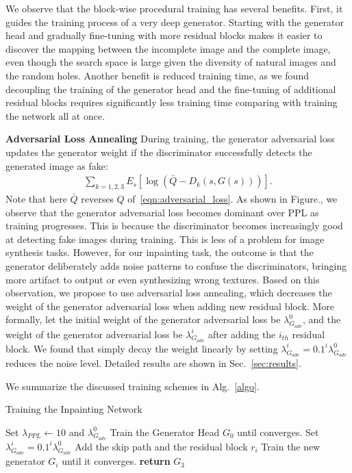 We observe that the block-wise procedural training has several benefits. First, it guides the training process of a very deep generator. Starting with the generator head and gradually fine-tuning with more residual blocks makes it easier to discover the mapping between the incomplete image and the complete image, even though the search space is large given the diversity of natural images and the random holes. Another benefit is reduced training time, as we found decoupling the training of the generator head and the fine-tuning of additional residual blocks requires significantly less training time comparing with training the network all at once.

\noindent\textbf{Adversarial Loss Annealing} During training, the generator adversarial loss updates the generator weight if the discriminator successfully detects the generated image as fake:
\begin{eqnarray*}
\sum\limits_{k=1,2,3}E_s[\log (\bar{Q}-D_k(s,G(s)))].
\end{eqnarray*}
Note that here $\bar{Q}$ reverses $Q$ of~\ref{eqn:adversarial_loss}. As shown in Figure., we observe that the generator adversarial loss becomes dominant over PPL as training progresses. This is because the discriminator becomes increasingly good at detecting fake images during training. This is less of a problem for image synthesis tasks. However, for our inpainting task, the outcome is that the generator deliberately adds noise patterns to confuse the discriminators, bringing more artifact to output or even synthesizing wrong textures. Based on this observation, we propose to use adversarial loss annealing, which decreases the weight of the generator adversarial loss when adding new residual block. More formally, let the initial weight of the generator adversarial loss be $\lambda^0_{G_{adv}}$, and the weight of the generator adversarial loss be $\lambda^i_{G_{adv}}$ after adding the $i_{th}$ residual block. We found that simply decay the weight linearly by setting $\lambda^i_{G_{adv}}=0.1^i\lambda^0_{G_{adv}}$ reduces the noise level. Detailed results are shown in Sec.~\ref{sec:results}.

We summarize the discussed training schemes in Alg.~\ref{algo}.
\begin{algorithm}
\caption{Training the Inpainting Network}\label{algo}
\begin{algorithmic}[1]
\State Set $\lambda_{PPL}\gets 10$ and $\lambda^0_{G_{adv}}$
\State Train the Generator Head $G_0$ until converges.
\State Set $\lambda^i_{G_{adv}}=0.1^i\lambda^0_{G_{adv}}$
\State Add the skip path and the residual block $r_i$ 
\State Train the new generator $G_i$ until it converges.
\EndFor
\State \textbf{return} $G_3$ 
\end{algorithmic}
\end{algorithm}
